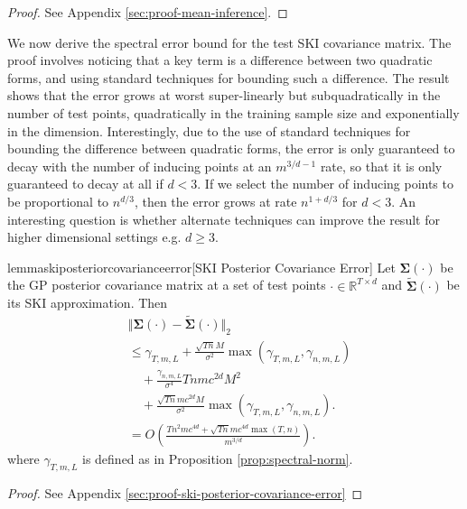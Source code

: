 \begin{proof}
See Appendix \ref{sec:proof-mean-inference}.
\end{proof}

We now derive the spectral error bound for the test SKI covariance matrix. The proof involves noticing that a key term is a difference between two quadratic forms, and using standard techniques for bounding such a difference. The result shows that the error grows at worst super-linearly but subquadratically in the number of test points, quadratically in the training sample size and exponentially in the dimension. Interestingly, due to the use of standard techniques for bounding the difference between quadratic forms, the error is only guaranteed to decay with the number of inducing points at an $m^{3/d-1}$ rate, so that it is only guaranteed to decay at all if $d<3$. If we select the number of inducing points to be proportional to $n^{d/3}$, then the error grows at rate $n^{1+d/3}$ for $d<3$. An interesting question is whether alternate techniques can improve the result for higher dimensional settings e.g. $d\geq 3$.

\begin{restatable}{lemma}{skiposteriorcovarianceerror}[SKI Posterior Covariance Error]\label{lemma:ski-posterior-covariance-error}
Let $\boldsymbol{\Sigma}(\cdot)$ be the GP posterior covariance matrix at a set of test points $\cdot\in \mathbb{R}^{T\times d}$ and $\tilde{\boldsymbol{\Sigma}}(\cdot)$ be its SKI approximation. Then
\begin{align*}
    &\Vert \boldsymbol{\Sigma}(\cdot)-\tilde{\boldsymbol{\Sigma}}(\cdot)\Vert_2\\ &\leq \gamma_{T,m,L} + \frac{\sqrt{Tn}M}{\sigma^2} \max(\gamma_{T,m,L},\gamma_{n,m,L})\\
    &\quad+ \frac{\gamma_{n,m,L}}{\sigma^4}Tn m c^{2d} M^2 \\
    &\quad+ \frac{\sqrt{Tn} m c^{2d} M}{\sigma^2} \max(\gamma_{T,m,L},\gamma_{n,m,L}).\\
    &=O\left(\frac{Tn^2mc^{4d}+\sqrt{Tn}mc^{4d}\max(T,n)}{m^{3/d}}\right).
\end{align*}
where $\gamma_{T,m,L}$ is defined as in Proposition \ref{prop:spectral-norm}.
\end{restatable}

\begin{proof}
See Appendix \ref{sec:proof-ski-posterior-covariance-error}

\end{proof}

